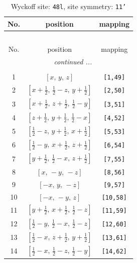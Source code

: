 \documentclass[fleqn,8pt]{jsarticle}
\begin{document}
\renewcommand{\arraystretch}{1.2}
\begin{longtable}{ccc}
\caption{Wyckoff site: {\tt 48l}, site symmetry: {\tt 11'}}
 \\
 \hline \hline
No. & position & mapping \\ \hline \endfirsthead

\multicolumn{2}{l}{\tablename\ \thetable{}} \\
 \hline \hline
No. & position & mapping \\ \hline \endhead

 \hline \hline
\multicolumn{2}{r}{\footnotesize\it continued ...} \\ \endfoot

 \hline \hline
\multicolumn{2}{r}{} \\ \endlastfoot

1 & $\left[ x,\, y,\, z \right]$ & {\tt [1,49]} \\ \hline
2 & $\left[ x + \frac{1}{2},\, \frac{1}{2} - z,\, y + \frac{1}{2} \right]$ & {\tt [2,50]} \\ \hline
3 & $\left[ x + \frac{1}{2},\, z + \frac{1}{2},\, \frac{1}{2} - y \right]$ & {\tt [3,51]} \\ \hline
4 & $\left[ z + \frac{1}{2},\, y + \frac{1}{2},\, \frac{1}{2} - x \right]$ & {\tt [4,52]} \\ \hline
5 & $\left[ \frac{1}{2} - z,\, y + \frac{1}{2},\, x + \frac{1}{2} \right]$ & {\tt [5,53]} \\ \hline
6 & $\left[ \frac{1}{2} - y,\, x + \frac{1}{2},\, z + \frac{1}{2} \right]$ & {\tt [6,54]} \\ \hline
7 & $\left[ y + \frac{1}{2},\, \frac{1}{2} - x,\, z + \frac{1}{2} \right]$ & {\tt [7,55]} \\ \hline
8 & $\left[ x,\, - y,\, - z \right]$ & {\tt [8,56]} \\ \hline
9 & $\left[ - x,\, y,\, - z \right]$ & {\tt [9,57]} \\ \hline
10 & $\left[ - x,\, - y,\, z \right]$ & {\tt [10,58]} \\ \hline
11 & $\left[ y + \frac{1}{2},\, x + \frac{1}{2},\, \frac{1}{2} - z \right]$ & {\tt [11,59]} \\ \hline
12 & $\left[ \frac{1}{2} - y,\, \frac{1}{2} - x,\, \frac{1}{2} - z \right]$ & {\tt [12,60]} \\ \hline
13 & $\left[ \frac{1}{2} - x,\, z + \frac{1}{2},\, y + \frac{1}{2} \right]$ & {\tt [13,61]} \\ \hline
14 & $\left[ \frac{1}{2} - x,\, \frac{1}{2} - z,\, \frac{1}{2} - y \right]$ & {\tt [14,62]} \\ \hline

\end{longtable}
\end{document}
